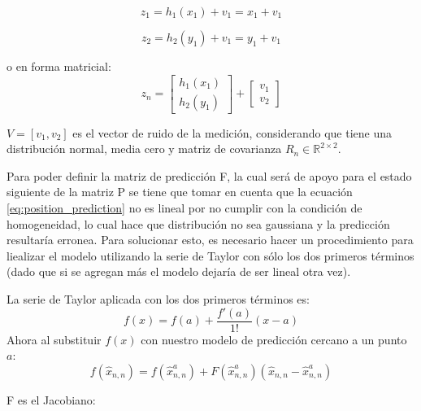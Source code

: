 \begin{equation}
z_1 = h_1(x_1) + v_1 = x_1 + v_1 
\label{eq:x_entry}
\end{equation}

\begin{equation}
z_2 = h_2(y_1) + v_1 = y_1 + v_1 
\label{eq:y_entry}
\end{equation}

o en forma matricial:
\begin{equation}
z_n =
\begin{bmatrix}
h_1(x_1) \\ 
h_2(y_1)
\end{bmatrix}
+
\begin{bmatrix}
v_1 \\ 
v_2
\end{bmatrix}
\end{equation}

$V = [v_1, v_2]$ es el vector de ruido de la medición, considerando que tiene una distribución normal, media cero y matriz de covarianza $R_n\in\mathbb{R}^{2\times 2}$.

    Para poder definir la matriz de predicción F, la cual será de apoyo para el estado siguiente de la matriz P se tiene que tomar en cuenta que la ecuación \ref{eq:position_prediction} no es lineal por no cumplir con la condición de homogeneidad, lo cual hace que distribución no sea gaussiana y la predicción resultaría erronea. Para solucionar esto, es necesario hacer un procedimiento para liealizar el modelo utilizando la serie de Taylor con sólo los dos primeros términos (dado que si se agregan más el modelo dejaría de ser lineal otra vez).
	
La serie de Taylor aplicada con los dos primeros términos es:
\begin{equation}
	f(x) = f(a) + \frac{f'(a)}{1!} (x-a)
\end{equation} 
Ahora al substituir $f(x)$ con nuestro modelo de predicción cercano a un punto $a$:
\begin{equation}
	f(\hat{x}_{n,n}) = f(\hat{x}^a_{n,n}) + F(\hat{x}^a_{n,n})(\hat{x}_{n,n} - \hat{x}^a_{n,n})
\end{equation}

F es el Jacobiano:

